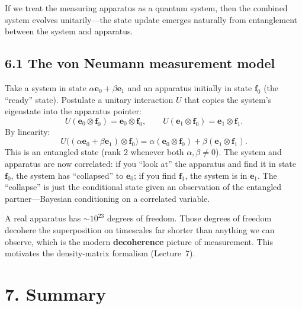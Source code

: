\documentclass[12pt,a4paper]{article}
\begin{document}
If we treat the measuring apparatus as a quantum system, then the combined system evolves unitarily---the state update emerges naturally from entanglement between the system and apparatus.

\subsection{6.1 The von Neumann measurement model}
Take a system in state $\alpha\mathbf{e}_0+\beta\mathbf{e}_1$ and an apparatus initially in state $\mathbf{f}_0$ (the ``ready'' state).  Postulate a unitary interaction $U$ that copies the system's eigenstate into the apparatus pointer:
\[
    U(\mathbf{e}_0\otimes\mathbf{f}_0) = \mathbf{e}_0\otimes\mathbf{f}_0, \qquad
    U(\mathbf{e}_1\otimes\mathbf{f}_0) = \mathbf{e}_1\otimes\mathbf{f}_1.
\]
By linearity:
\[
    U\bigl((\alpha\mathbf{e}_0+\beta\mathbf{e}_1)\otimes\mathbf{f}_0\bigr)
    = \alpha(\mathbf{e}_0\otimes\mathbf{f}_0) + \beta(\mathbf{e}_1\otimes\mathbf{f}_1).
\]
This is an entangled state (rank 2 whenever both $\alpha,\beta\neq 0$).  The system and apparatus are now correlated: if you ``look at'' the apparatus and find it in state $\mathbf{f}_0$, the system has ``collapsed'' to $\mathbf{e}_0$; if you find $\mathbf{f}_1$, the system is in $\mathbf{e}_1$.  The ``collapse'' is just the conditional state given an observation of the entangled partner---Bayesian conditioning on a correlated variable.

\medskip
\noindent A real apparatus has $\sim 10^{23}$ degrees of freedom.  Those degrees of freedom decohere the superposition on timescales far shorter than anything we can observe, which is the modern \textbf{decoherence} picture of measurement.  This motivates the density-matrix formalism (Lecture~7).

\section{7. Summary}
\end{document}
